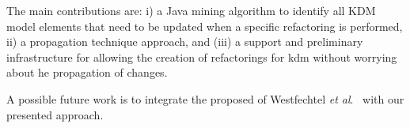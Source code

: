 
The main contributions are: i) a Java mining algorithm to identify all KDM model elements that need to be updated when a specific refactoring is performed, ii) a propagation technique approach, and (iii) a support and preliminary infrastructure for allowing the creation of refactorings for kdm without worrying about he propagation of changes.

 A possible future work is to integrate the proposed of Westfechtel \textit{et al}.~\cite{ICSOFT2014_Winetzhammer} with our presented approach.